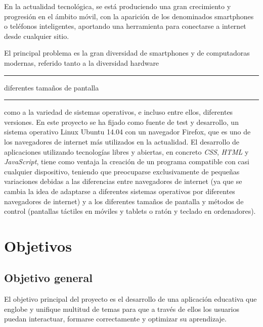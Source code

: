 \documentclass[a4paper, 12pt]{book}
\begin{document}
En la actualidad tecnol\'ogica, se est\'a produciendo una gran crecimiento y progresi\'on en el \'ambito m\'ovil, con la aparici\'on de los 
denominados smartphones o tel\'efonos inteligentes, aportando una herramienta para conectarse a internet desde cualquier sitio.

El principal problema es la gran diversidad de smartphones y de computadoras modernas, referido tanto a la diversidad hardware 
\rule[1mm]{4mm}{0.1mm}diferentes tama\~nos de pantalla\rule[1mm]{4mm}{0.1mm} como a la variedad de sistemas operativos, e incluso entre ellos, 
diferentes versiones. En este proyecto se ha fijado 
como fuente de test y desarrollo, un sistema operativo Linux Ubuntu 14.04 con un navegador Firefox, que es uno de los navegadores de internet m\'as 
utilizados en la actualidad. El desarrollo de aplicaciones utilizando tecnolog\'ias libres y abiertas, en concreto \textit{CSS}, \textit{HTML} y 
\textit{JavaScript}, tiene como ventaja la creaci\'on de un programa compatible con casi cualquier dispositivo, teniendo que preocuparse exclusivamente 
de peque\~nas variaciones debidas a las diferencias entre navegadores de internet (ya que se cambia
la idea de adaptarse a diferentes sistemas operativos por diferentes navegadores de internet) y a los diferentes tama\~nos de pantalla y m\'etodos
de control (pantallas t\'actiles en m\'oviles y tablets o rat\'on y teclado en ordenadores).








\cleardoublepage
\chapter{Objetivos}
\label{chap:objetivos}

\section{Objetivo general}
\label{sec:objetivo-general}
El objetivo principal del proyecto es el desarrollo de una aplicaci\'on educativa que englobe y unifique multitud de temas para que a trav\'es de ellos los usuarios 
puedan interactuar, formarse correctamente y optimizar su aprendizaje.
\end{document}
